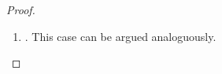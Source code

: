 \begin{proof}
\begin{description}
\begin{itemize}
\begin{enumerate}
						\item {}.
							This case can be argued analoguously.
			\qedhere
					\end{enumerate}


			\end{itemize}

			\begin{comment} %
		\item[\normalfont Equality rules.]
			Suppose the property holds for $n$ rule applications and the $(n+1)$th rule is an equality rule.
			We consider an example:

			\begin{itemize}
				\item The last rule application was an instance of $\lkrule{=}{r_1}$. Then it is of the form:
					\begin{prooftree}
						\Axiomm{\Gamma\fCenter \Delta, A\subst{T/t} }
						\Axiomm{\Sigma \fCenter \Pi, s=t}
						\RightLabelm{\lkrule{=}{r_1}}
						\BinaryInfm{\Gamma, \Sigma\fCenter \Delta, \Pi, A\subst{T/s}  }
					\end{prooftree}

					There are two possible partitions of $\Gamma, \Sigma \vdash \Delta, \Pi A\subst{T/s} $:
					\begin{enumerate}
						\item $\partisym = \parti{\Gamma_1, \Sigma_1}{\Delta_1, \Pi_1, A\subst{T/s}}{\Gamma_2, \Sigma_2}{\Delta_2, \Pi_2}$.  

					By the induction hypothesis, there is an interpolant $I_1$ for the partition $\parti{\Gamma_1}{\Delta_1, A\subst{T/t}}{\Gamma_2}{\Delta_2}$ of the left upper sequent.
					Hence $\Gamma_1 \fCenter \Delta_1, A\subst{T/t}, I_1$ and $I_1, \Gamma_2 \fCenter \Delta_2$.

					We also get by the induction hypothesis that there is an interpolant $I_2$ for the partition $\parti{\Sigma_1}{\Pi_1, s=t}{\Sigma_2}{\Pi_2}$ of the right upper sequent. Here, we have that 
					$\Sigma_1 \fCenter \Pi_1, s=t, I_2$ and $I_2, \Sigma_2 \fCenter \Pi_2$.

					Now we establish that $I_1 \lor I_2$ is an interpolant for $\partisym$.

					\begin{prooftree}
						\Axiomm{\Gamma_1 \fCenter \Delta_1, A\subst{T/t}, I_1}
						\Axiomm{\Sigma_1 \fCenter \Pi_1, s=t, I_2}
						\RightLabelm{\lkrule{=}{r_2}}
						\BinaryInfm{\Gamma_1, \Sigma_1 \fCenter \Delta_1, \Pi_1, A\subst{T/s}, I_1, I_2}
						\RightLabelm{\lkrule{\lor}{r}}
						\UnaryInfm{\Gamma_1, \Sigma_1 \fCenter \Delta_1, \Pi_1, A\subst{T/s}, I_1 \lor I_2}
					\end{prooftree}


\end{comment}
\end{description}
\end{proof}
